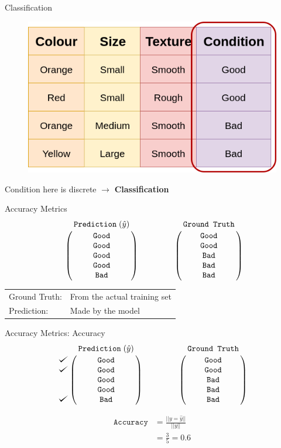 \documentclass{beamer}
\def\checkmark{\tikz\fill[scale=0.4](0,.35) -- (.25,0) -- (1,.7) -- (.25,.15) -- cycle;}
\begin{document}
\begin{frame}{Classification}
\begin{figure}[htp]
    \centering
    \includegraphics[width=0.7\linewidth]{accuracy/ml_2_accuracy_table_5.png}
\end{figure}

\begin{center}
Condition here is discrete $\rightarrow$ \textbf{Classification}
\end{center}

\end{frame}

\begin{frame}{Accuracy Metrics}
$$\bordermatrix{&\texttt{Prediction}\;(\hat{y})\cr
                &\texttt{Good}\cr
                &\texttt{Good}\cr
                &\texttt{Good}\cr
                &\texttt{Good}\cr
                &\texttt{Bad}}
                \qquad \qquad
   \bordermatrix{&\texttt{Ground Truth}\cr
                &\texttt{Good}\cr
                &\texttt{Good}\cr
                &\texttt{Bad}\cr
                &\texttt{Bad}\cr
                &\texttt{Bad}}
$$

\vspace{1cm}

\begin{tabular}{ll}
Ground Truth: & From the actual training set \\ 
Prediction: & Made by the model \\ 
\end{tabular}

\end{frame}

\begin{frame}{Accuracy Metrics: Accuracy}
$$
\bordermatrix{&\texttt{Prediction}\;(\hat{y})\cr
               \checkmark&\texttt{Good}\cr
               \checkmark&\texttt{Good}\cr
                &\texttt{Good}\cr
                &\texttt{Good}\cr
               \checkmark&\texttt{Bad}}
\qquad \qquad
\bordermatrix{&\texttt{Ground Truth}\cr
                &\texttt{Good}\cr
                &\texttt{Good}\cr
                &\texttt{Bad}\cr
                &\texttt{Bad}\cr
                &\texttt{Bad}}
$$

\begin{align*}
\texttt{Accuracy} &= \frac{||y = \hat{y}||}{||y||} \\
&= \frac{3}{5} = 0.6
\end{align*}

\end{frame}
\end{document}
